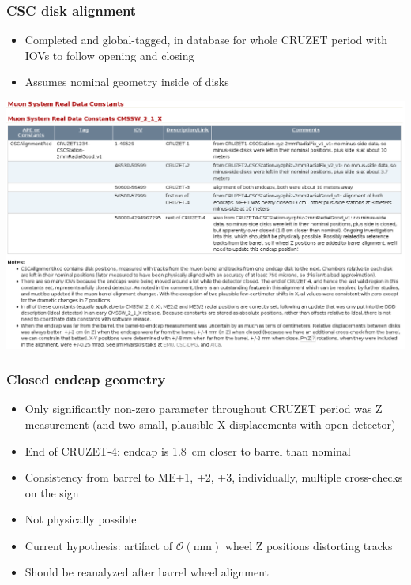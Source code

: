 \documentclass[compress]{beamer}
\begin{document}
\begin{frame}
\frametitle{CSC disk alignment}
\small
\begin{itemize}
\item Completed and global-tagged, in database for whole CRUZET period with IOVs to follow opening and closing
\item Assumes nominal geometry inside of disks
\end{itemize}
\includegraphics[width=\linewidth]{twiki_page.png}
\end{frame}

\begin{frame}
\frametitle{Closed endcap geometry}
\small
\begin{itemize}
\item Only significantly non-zero parameter throughout CRUZET period
  was Z measurement (and two small, plausible X displacements with
  open detector)
\item End of CRUZET-4: endcap is 1.8~cm closer to barrel than nominal
\item Consistency from barrel to ME+1, +2, +3, individually, multiple cross-checks on the sign
\item Not physically possible
\item Current hypothesis: artifact of $\mathcal{O}(\mbox{mm})$ wheel Z positions distorting tracks
\item Should be reanalyzed after barrel wheel alignment
\end{itemize}
\end{frame}
\end{document}
